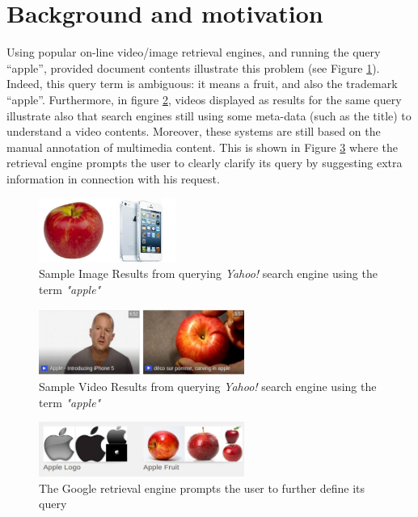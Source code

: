 	\section*{Background and motivation}
	


	
Using popular on-line video/image retrieval engines, and running the query “apple”, provided document contents illustrate this problem (see Figure \ref{fig_intro::serach_image}). Indeed, this query term is ambiguous: it means a fruit, and also the trademark “apple”. Furthermore, in figure \ref{fig_intro::serach_video}, videos displayed as results for the same query illustrate also that search engines still using some meta-data (such as the title) to understand a video contents. Moreover, these systems are still based on the manual annotation of multimedia content. This is shown in Figure \ref{fig_intro::serach_extra} where the retrieval engine prompts the user to clearly clarify its query by suggesting extra information in connection with his request.
	
		\begin{figure}[ht!]
				\centering
				\includegraphics[width=0.4\textwidth]{figures/fig_intro::serach_image}	
				\caption{Sample Image Results from querying \textit{Yahoo!} search engine using the term \textit{"apple"}}
				\label{fig_intro::serach_image}
			\end{figure}
			\begin{figure}[ht!]
					\centering
					\includegraphics[width=0.6\textwidth]{figures/fig_intro::serach_video}
					\caption{Sample Video Results from querying \textit{Yahoo!} search engine using the term \textit{"apple"}}
					\label{fig_intro::serach_video}
			\end{figure}
			\begin{figure}[ht!]
					\centering
					\includegraphics[width=0.6\textwidth]{figures/fig_intro::serach_extra}
					\caption{The Google retrieval engine prompts the user to further define its query}
					\label{fig_intro::serach_extra}
			\end{figure}
	
